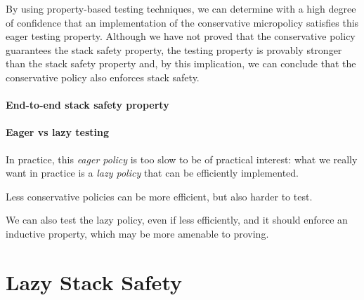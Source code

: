 \documentclass[acmsmall,review,anonymous]{acmart}\settopmatter{printfolios=true,printccs=false,printacmref=false}
\begin{document}
By using property-based testing techniques, we can determine with a high degree
of confidence that an implementation of the conservative micropolicy satisfies
this eager testing property. Although we have not proved that the conservative
policy guarantees the stack safety property, the testing property is provably
stronger than the stack safety property  and, by this implication,
we can conclude that the conservative policy also enforces stack safety.



\paragraph*{End-to-end stack safety property}

\paragraph*{Eager vs lazy testing}

%
In practice, this \emph{eager policy} is too slow to be of practical interest:
what we really want in practice is a \emph{lazy policy} that can be efficiently
implemented.

Less conservative policies can be more efficient, but also harder to test.

We can also test the lazy policy, even if less efficiently, and it should
enforce an inductive property, which may be more amenable to proving.
%
%



\section{Lazy Stack Safety}
\label{sec:lazy}

\end{document}
